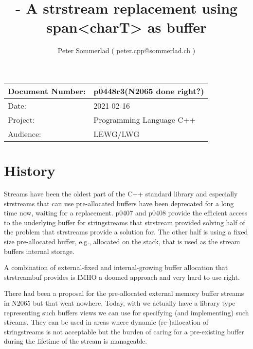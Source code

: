 \documentclass[ebook,11pt,article]{memoir}
\title{\papernumber{} - A strstream replacement using span\textless{}charT\textgreater{} as buffer}
\author{Peter Sommerlad 
( peter.cpp@sommerlad.ch )}
\date{\paperdate}                %
\newcommand{\papernumber}{p0448r3}
\newcommand{\paperdate}{2021-02-16}
\begin{document}
\maketitle
\begin{center}
\begin{tabular}[t]{|l|l|}\hline 
Document Number:&  \papernumber \hfill (N2065 done right?)\\\hline
Date: & \paperdate \\\hline
Project: & Programming Language C++\\\hline 
Audience: & LEWG/LWG\\\hline
\end{tabular}
\end{center}
\chapter{History}
Streams have been the oldest part of the C++ standard library and especially strstreams that can use pre-allocated buffers have been deprecated for a long time now, waiting for a replacement. p0407 and p0408 provide the efficient access to the underlying buffer for stringstreams that strstream provided solving half of the problem that strstreams provide a solution for. The other half is using a fixed size pre-allocated buffer, e.g., allocated on the stack, that is used as the stream buffers internal storage.

A combination of external-fixed and internal-growing buffer allocation that strstreambuf provides is IMHO a doomed approach and very hard to use right.

There had been a proposal for the pre-allocated external memory buffer streams in N2065 but that went nowhere. Today, with  we actually have a library type representing such buffers views we can use for specifying (and implementing) such streams. They can be used in areas where dynamic (re-)allocation of stringstreams is not acceptable but the burden of caring for a pre-existing buffer during the lifetime of the stream is manageable. 
\end{document}
